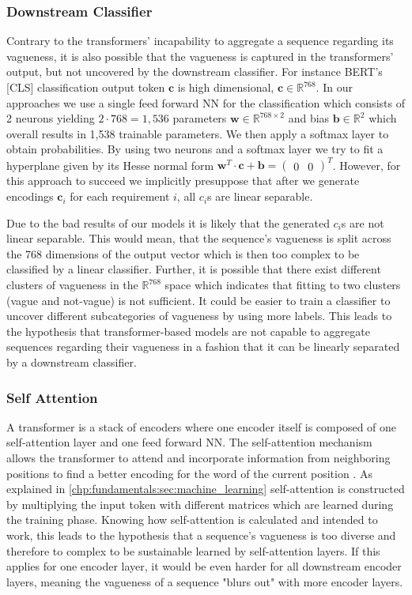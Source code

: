 \subsubsection{Downstream Classifier}
\label{chp:study:sec:interpretation:subsec:causes:downstream_classifier}
Contrary to the transformers' incapability to aggregate a sequence regarding its vagueness, it is also possible that the vagueness is captured in the transformers' output, but not uncovered by the downstream classifier.
For instance \ac{BERT}'s [CLS] classification output token $\bm{c}$ is high dimensional, $\bm{c} \in \mathbb{R}^{768}$.
In our approaches we use a single feed forward \ac{NN} for the classification which consists of 2 neurons yielding $2 \cdot 768 = 1,536$ parameters $\bm{w} \in \mathbb{R}^{768 \times 2}$ and bias $\bm{b} \in \mathbb{R}^2$ which overall results in 1,538 trainable parameters.
We then apply a softmax layer to obtain probabilities.
By using two neurons and a softmax layer we try to fit a hyperplane given by its Hesse normal form $ \bm{w}^T \cdot \bm{c} + \bm{b} = \begin{pmatrix} 0 & 0 \end{pmatrix}^T$.
However, for this approach to succeed we implicitly presuppose that after we generate encodings $\bm{c}_i$ for each requirement $i$, all $c_i$s are linear separable.

Due to the bad results of our models it is likely that the generated $c_i$s are not linear separable.
This would mean, that the sequence's vagueness is split across the 768 dimensions of the output vector which is then too complex to be classified by a linear classifier.
Further, it is possible that there exist different clusters of vagueness in the $\mathbb{R}^{768}$ space which indicates that fitting to two clusters (vague and not-vague) is not sufficient.
It could be easier to train a classifier to uncover different subcategories of vagueness by using more labels.
This leads to the hypothesis that transformer-based models are not capable to aggregate sequences regarding their vagueness in a fashion that it can be linearly separated by a downstream classifier.

\subsubsection{Self Attention}
\label{chp:study:sec:interpretation:subsec:causes:self_attention}
A transformer is a stack of encoders where one encoder itself is composed of one self-attention layer and one feed forward \ac{NN}.
The self-attention mechanism allows the transformer to attend and incorporate information from neighboring positions to find a better encoding for the word of the current position \parencite{Vaswani:2017}.
As explained in \cref{chp:fundamentals:sec:machine_learning} self-attention is constructed by multiplying the input token with different matrices which are learned during the training phase.
Knowing how self-attention is calculated and intended to work, this leads to the hypothesis that a sequence's vagueness is too diverse and therefore to complex to be sustainable learned by self-attention layers.
If this applies for one encoder layer, it would be even harder for all downstream encoder layers, meaning the vagueness of a sequence "blurs out" with more encoder layers.
